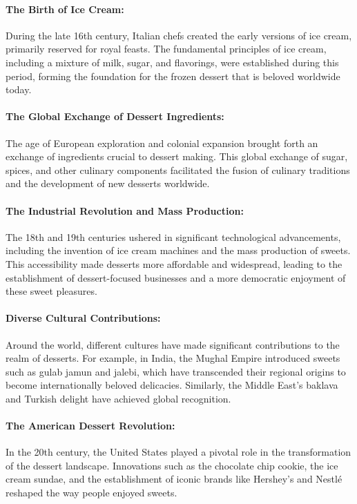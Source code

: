 \paragraph{The Birth of Ice Cream:} During the late 16th century, Italian chefs created the early versions of ice cream, primarily reserved for royal feasts. The fundamental principles of ice cream, including a mixture of milk, sugar, and flavorings, were established during this period, forming the foundation for the frozen dessert that is beloved worldwide today.

\paragraph{The Global Exchange of Dessert Ingredients:} The age of European exploration and colonial expansion brought forth an exchange of ingredients crucial to dessert making. This global exchange of sugar, spices, and other culinary components facilitated the fusion of culinary traditions and the development of new desserts worldwide.

\paragraph{The Industrial Revolution and Mass Production:} The 18th and 19th centuries ushered in significant technological advancements, including the invention of ice cream machines and the mass production of sweets. This accessibility made desserts more affordable and widespread, leading to the establishment of dessert-focused businesses and a more democratic enjoyment of these sweet pleasures.

\paragraph{Diverse Cultural Contributions:} Around the world, different cultures have made significant contributions to the realm of desserts. For example, in India, the Mughal Empire introduced sweets such as gulab jamun and jalebi, which have transcended their regional origins to become internationally beloved delicacies. Similarly, the Middle East's baklava and Turkish delight have achieved global recognition.

\paragraph{The American Dessert Revolution:} In the 20th century, the United States played a pivotal role in the transformation of the dessert landscape. Innovations such as the chocolate chip cookie, the ice cream sundae, and the establishment of iconic brands like Hershey's and Nestlé reshaped the way people enjoyed sweets.

